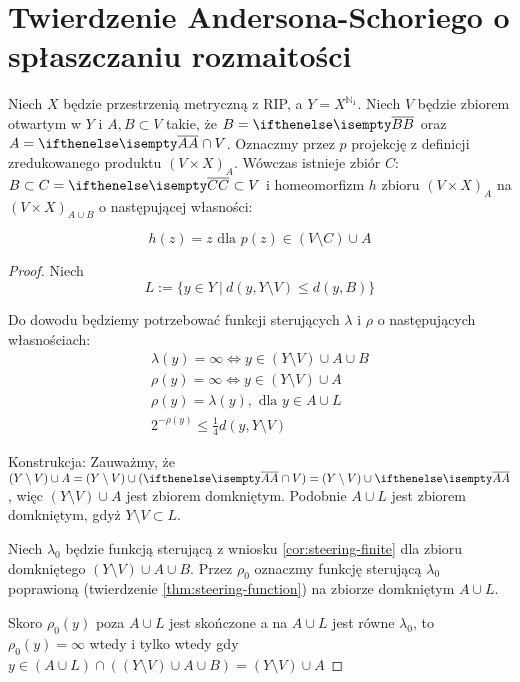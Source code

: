 \section{Twierdzenie Andersona-Schoriego o spłaszczaniu rozmaitości}

\begin{lem} \label{lem:flat}
  Niech $X$ będzie przestrzenią metryczną z RIP, a $Y = X^{\mathbb{N}_1}$. Niech $V$ będzie zbiorem otwartym w $Y$ i $A, B \subset V$ takie, że $B = \cl{B}$ oraz $A = \cl{A} \cap V$. Oznaczmy przez $p$ projekcję z definicji zredukowanego produktu $(V \times X)_A$. Wówczas istnieje zbiór $C$: $B \subset C = \cl{C} \subset V$ i homeomorfizm $h$ zbioru $(V \times X)_A$ na $(V \times X)_{A \cup B}$ o następującej własności:
  
  \begin{equation} \label{eq:as-lem-1}
  h(z) = z \mbox{ dla } p(z) \in (V \setminus C) \cup A
  \end{equation}
  
  \begin{proof}
    Niech
    \[L := \{y \in Y\ |\ d(y, Y \setminus V) \leq d(y, B)\}\]
    
    Do dowodu będziemy potrzebować funkcji sterujących $\lambda$ i $\rho$ o następujących własnościach:
    \begin{gather}
      \label{lambda-infty} \lambda(y) = \infty \Leftrightarrow y \in (Y \setminus V) \cup A \cup B \\
      \label{rho-infty} \rho(y) = \infty \Leftrightarrow y \in (Y \setminus V) \cup A \\
      \label{rho-eq-lambda} \rho(y) = \lambda(y), \mbox{ dla } y \in A \cup L \\
      \label{rho-dist} 2^{-\rho(y)} \leq \frac{1}{4} d(y, Y \setminus V)
    \end{gather}
    
    Konstrukcja:
    Zauważmy, że $(Y \setminus V) \cup A = (Y \setminus V) \cup (\cl{A} \cap V) = (Y \setminus V) \cup \cl{A}$, więc $(Y \setminus V) \cup A$ jest zbiorem domkniętym. Podobnie $A \cup L$ jest zbiorem domkniętym, gdyż $Y \setminus V \subset L$.
    
    Niech $\lambda_0$ będzie funkcją sterującą z wniosku \ref{cor:steering-finite} dla zbioru domkniętego $(Y \setminus V) \cup A \cup B$. Przez $\rho_0$ oznaczmy funkcję sterującą $\lambda_0$ poprawioną (twierdzenie \ref{thm:steering-function}) na zbiorze domkniętym $A \cup L$.
    
    Skoro $\rho_0(y)$ poza $A \cup L$ jest skończone a na $A \cup L$ jest równe $\lambda_0$, to $\rho_0(y) = \infty$ wtedy i tylko wtedy gdy $y \in (A \cup L) \cap ((Y \setminus V) \cup A \cup B) = (Y \setminus V) \cup A$
    

\end{proof}
\end{lem}
